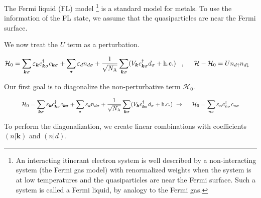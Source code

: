 \documentclass[a4j]{jarticle}
\begin{document}
${}$

The Fermi liquid (FL) model
\footnote{
	An interacting itinerant electron system is well described by a non-interacting system (the Fermi gas model) with renormalized weights when the system is at low temperatures and the quasiparticles are near the Fermi surface.
	Such a system is called a Fermi liquid, by analogy to the Fermi gas.
}
is a standard model for metals.
To use the information of the FL state, we assume that the quasiparticles are near the Fermi surface.

We now treat the $U$ term as a perturbation.

\begin{align}
	\mathcal{H}_{0}
	 & =
	\sum_{\bm{k}\sigma}
	\varepsilon_{\bm{k}}
	c^{\dagger}_{\bm{k} \sigma}
	c_{\bm{k} \sigma}
	+
	\sum_{\sigma}
	\varepsilon_{d}
	n_{d \sigma}
	+
	\frac{1}{\sqrt{N_{\rm A}}}
	\sum_{\bm{k}\sigma}
	(
	V_{\bm{k}}
	c_{\bm{k}\sigma}^{\dagger}
	d_{\sigma}
	+
	{\rm h.c.}
	)
	\hspace{3mm}
	,
	\hspace{5mm}
	\mathcal{H}
	-
	\mathcal{H}_{0}
	=
	U
	n_{d \uparrow}
	n_{d \downarrow}
\end{align}

Our first goal is to diagonalize the non-perturbative term $\mathcal{H}_{0}$.

\begin{align}
	\hspace{10.2mm}
	\mathcal{H}_{0}
	=
	\sum_{\bm{k}\sigma}
	\varepsilon_{\bm{k}}
	c^{\dagger}_{\bm{k} \sigma}
	c_{\bm{k} \sigma}
	+
	\sum_{\sigma}
	\varepsilon_{d}
	n_{d \sigma}
	+
	\frac{1}{\sqrt{N_{\rm A}}}
	\sum_{\bm{k}\sigma}
	(
	V_{\bm{k}}
	c_{\bm{k}\sigma}^{\dagger}
	d_{\sigma}
	+
	{\rm h.c.}
	)
	\
	\to
	\hspace{5mm}
	\mathcal{H}_{0}
	=
	\sum_{n \sigma}
	\varepsilon_{n}
	c_{n \sigma}^{\dagger}
	c_{n \sigma}
	\hspace{10.2mm}
\end{align}

To perform the diagonalization, we create linear combinations with coefficients $( n | \bm{k} )$ and $( n | d )$.
\end{document}

